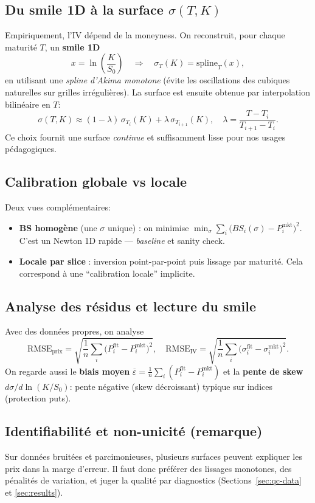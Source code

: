 \documentclass[11pt,a4paper]{article}
\begin{document}
\subsection{Du smile 1D à la surface $\sigma(T,K)$}
Empiriquement, l'IV dépend de la moneyness. On reconstruit, pour chaque maturité $T$, un \textbf{smile 1D}
\[
x=\ln\!\left(\frac{K}{S_0}\right)\quad\Rightarrow\quad \sigma_T(K)=\text{spline}_T(x),
\]
en utilisant une \emph{spline d'Akima monotone} (évite les oscillations des cubiques naturelles sur grilles irrégulières).
La surface est ensuite obtenue par interpolation bilinéaire en $T$:
\[
\sigma(T,K) \approx (1-\lambda)\,\sigma_{T_i}(K) + \lambda\,\sigma_{T_{i+1}}(K),
\quad \lambda=\frac{T-T_i}{T_{i+1}-T_i}.
\]
Ce choix fournit une surface \emph{continue} et suffisamment lisse pour nos usages pédagogiques.

\subsection{Calibration globale vs locale}
Deux vues complémentaires:
\begin{itemize}[leftmargin=*]
  \item \textbf{BS homogène} (une $\sigma$ unique) : on minimise 
        $\min_{\sigma}\sum_i \big(BS_i(\sigma)-P^{\text{mkt}}_i\big)^2$.
        C'est un Newton 1D rapide — \emph{baseline} et sanity check.
  \item \textbf{Locale par slice} : inversion point-par-point puis lissage par maturité.
        Cela correspond à une “calibration locale” implicite.
\end{itemize}

\subsection{Analyse des résidus et lecture du smile}
Avec des données propres, on analyse
\[
\text{RMSE}_\text{prix}=\sqrt{\frac1n\sum_i\big(P^{\text{fit}}_i-P^{\text{mkt}}_i\big)^2},
\quad
\text{RMSE}_\text{IV}=\sqrt{\frac1n\sum_i\big(\sigma^{\text{fit}}_i-\sigma^{\text{mkt}}_i\big)^2}.
\]
On regarde aussi le \textbf{biais moyen} $\overline{\varepsilon}=\tfrac1n\sum_i(P^{\text{fit}}_i-P^{\text{mkt}}_i)$ et la
\textbf{pente de skew} $d\sigma/d\ln(K/S_0)$: pente négative (skew décroissant) typique sur indices (protection puts).

\subsection{Identifiabilité et non-unicité (remarque)}
Sur données bruitées et parcimonieuses, plusieurs surfaces peuvent expliquer
les prix dans la marge d'erreur. Il faut donc préférer des lissages monotones, des pénalités de variation,
et juger la qualité par diagnostics (Sections~\ref{sec:qc-data} et \ref{sec:results}).
\end{document}
